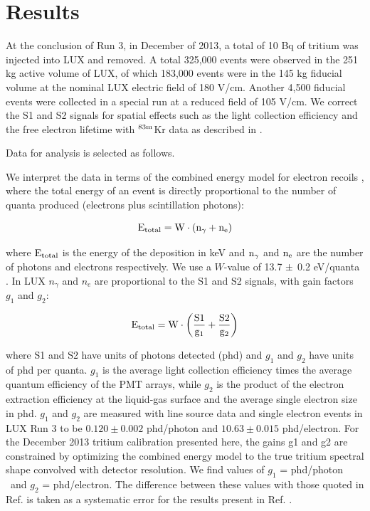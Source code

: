\section{Results}

At the conclusion of Run 3, in December of 2013, a total of 10 Bq of tritium was injected into LUX and removed. A total 325,000 events were observed in the 251 kg active volume of LUX, of which 183,000 events were in the 145 kg fiducial volume at the nominal LUX electric field of 180 V/cm. Another 4,500 fiducial events were collected in a special run at a reduced field of 105 V/cm. We correct the S1 and S2 signals for spatial effects such as the light collection efficiency and the free electron lifetime with $\rm ^{83m}$Kr data as described in \cite{lux-reanalysis}. 


Data for analysis is selected as follows. 

We interpret the data in terms of the combined energy model for electron recoils \cite{Platzman}, where the total energy of an event is directly proportional to the number of quanta produced (electrons plus scintillation photons):

\begin{equation}
\rm E_{total} = W \cdot (n_{\gamma} + n_e )
\label{platzman_eq}
\end{equation}

\noindent
where $\rm E_{total}$ is the energy of the deposition in keV and  $\rm n_\gamma$ and $\rm n_e$ are the number of photons and electrons respectively. We use a $W$-value of 13.7 $\rm \pm$ 0.2 eV/quanta \cite{Dahl_Thesis}. In LUX $n_{\gamma}$ and $n_e$ are proportional to the S1 and S2 signals, with gain factors $g_1$ and $g_2$: 

\begin{equation}
\rm E_{total} = W \cdot \left(\frac{S1}{g_1} + \frac{S2}{g_2} \right)
\label{energy_eq}
\end{equation}

\noindent
where S1 and S2 have units of photons detected (phd) and $g_1$ and $g_2$ have units of phd per quanta. $g_1$ is the average light collection efficiency times the average quantum efficiency of the PMT arrays, while $g_2$ is the product of the electron extraction efficiency at the liquid-gas surface and the average single electron size in phd. $g_1$ and $g_2$ are measured with line source data and single electron events in LUX Run 3 to be $0.120 \pm 0.002$ phd/photon and $10.63 \pm 0.015$ phd/electron\cite{lux-reanalysis, lux-prd}. For the December 2013 tritium calibration presented here, the gains g1 and g2 are constrained by optimizing the combined energy model to the true tritium spectral shape \cite{Tritium_Eq_Simpson} convolved with detector resolution. We find values of $g_1$ = \gone  phd/photon ~and  $g_2$ = \gtwo phd/electron.  The difference between these values with those quoted in Ref. \cite{lux-reanalysis, lux-prd} is taken as a systematic error for the results present in Ref. \cite{lux-reanalysis, lux-prd}.

